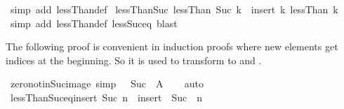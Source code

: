 \begin{isabellebody}
%
\isadelimproof
%
\endisadelimproof
%
\isatagproof
{}\isamarkupfalse%
\ {\isacharparenleft}{\kern0pt}simp\ add{\isacharcolon}{\kern0pt}\ lessThan{\isacharunderscore}{\kern0pt}def{\isacharparenright}{\kern0pt}%
\endisatagproof
{\isafoldproof}%
%
\isadelimproof
\isanewline
%
\endisadelimproof
\isanewline
{}\isamarkupfalse%
\ lessThan{\isacharunderscore}{\kern0pt}Suc{\isacharcolon}{\kern0pt}\ {\isachardoublequoteopen}lessThan\ {\isacharparenleft}{\kern0pt}Suc\ k{\isacharparenright}{\kern0pt}\ {\isacharequal}{\kern0pt}\ insert\ k\ {\isacharparenleft}{\kern0pt}lessThan\ k{\isacharparenright}{\kern0pt}{\isachardoublequoteclose}\isanewline
%
\isadelimproof
%
\endisadelimproof
%
\isatagproof
{}\isamarkupfalse%
\ {\isacharparenleft}{\kern0pt}simp\ add{\isacharcolon}{\kern0pt}\ lessThan{\isacharunderscore}{\kern0pt}def\ less{\isacharunderscore}{\kern0pt}Suc{\isacharunderscore}{\kern0pt}eq{\isacharcomma}{\kern0pt}\ blast{\isacharparenright}{\kern0pt}%
\endisatagproof
{\isafoldproof}%
%
\isadelimproof
%
\endisadelimproof
%
\begin{isamarkuptext}%
The following proof is convenient in induction proofs where
new elements get indices at the beginning. So it is used to transform
 to  and .%
\end{isamarkuptext}\isamarkuptrue%
\isamarkupfalse%
\ zero{\isacharunderscore}{\kern0pt}notin{\isacharunderscore}{\kern0pt}Suc{\isacharunderscore}{\kern0pt}image\ {\isacharbrackleft}{\kern0pt}simp{\isacharbrackright}{\kern0pt}{\isacharcolon}{\kern0pt}\ {\isachardoublequoteopen}{}\ {\isasymnotin}\ Suc\ {\isacharbackquote}{\kern0pt}\ A{\isachardoublequoteclose}\isanewline
%
\isadelimproof
\ \ %
\endisadelimproof
%
\isatagproof
{}\isamarkupfalse%
\ auto%
\endisatagproof
{\isafoldproof}%
%
\isadelimproof
\isanewline
%
\endisadelimproof
\isanewline
{}\isamarkupfalse%
\ lessThan{\isacharunderscore}{\kern0pt}Suc{\isacharunderscore}{\kern0pt}eq{\isacharunderscore}{\kern0pt}insert{\isacharunderscore}{\kern0pt}{}{\isacharcolon}{\kern0pt}\ {\isachardoublequoteopen}{\isacharbraceleft}{\kern0pt}{\isachardot}{\kern0pt}{\isachardot}{\kern0pt}{\isacharless}{\kern0pt}Suc\ n{\isacharbraceright}{\kern0pt}\ {\isacharequal}{\kern0pt}\ insert\ {}\ {\isacharparenleft}{\kern0pt}Suc\ {\isacharbackquote}{\kern0pt}\ {\isacharbraceleft}{\kern0pt}{\isachardot}{\kern0pt}{\isachardot}{\kern0pt}{\isacharless}{\kern0pt}n{\isacharbraceright}{\kern0pt}{\isacharparenright}{\kern0pt}{\isachardoublequoteclose}\isanewline

\end{isabellebody}
